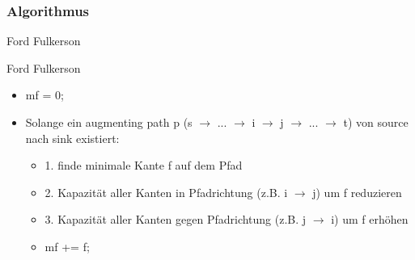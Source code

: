 \subsubsection{Algorithmus}
\begin{frame}{Ford Fulkerson}
  \begin{block}{Ford Fulkerson}
    \begin{itemize}
      \item mf = 0;
      \pause
      \item Solange ein augmenting path p (s $\rightarrow$ ...  $\rightarrow$ i $\rightarrow$ j $\rightarrow$ ... $\rightarrow$ t) von source nach sink existiert:
      \pause
      \begin{itemize}
      \item 1. finde minimale Kante f auf dem Pfad
      \pause
      \item 2. Kapazität aller Kanten in Pfadrichtung (z.B. i $\rightarrow$ j) um f reduzieren
      \pause
      \item 3. Kapazität aller Kanten gegen Pfadrichtung (z.B. j $\rightarrow$ i) um f erhöhen 
      \pause
      \item mf += f;
      \end{itemize}
    \end{itemize}
  \end{block}
\end{frame}
